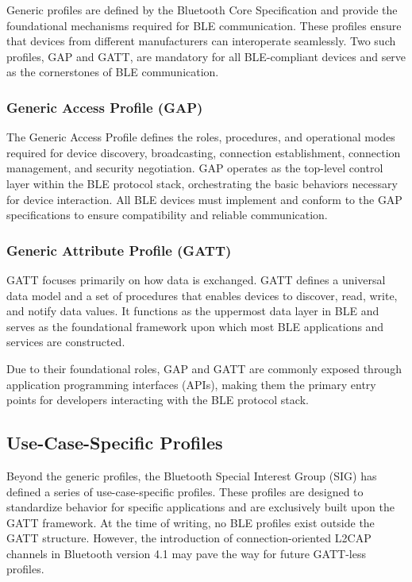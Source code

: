 Generic profiles are defined by the Bluetooth Core Specification and provide the foundational mechanisms required for BLE communication. These profiles ensure that devices from different manufacturers can interoperate seamlessly. Two such profiles, GAP and GATT, are mandatory for all BLE-compliant devices and serve as the cornerstones of BLE communication.

\subsubsection{Generic Access Profile (GAP)}

The Generic Access Profile defines the roles, procedures, and operational modes required for device discovery, broadcasting, connection establishment, connection management, and security negotiation. GAP operates as the top-level control layer within the BLE protocol stack, orchestrating the basic behaviors necessary for device interaction. All BLE devices must implement and conform to the GAP specifications to ensure compatibility and reliable communication.

\subsubsection{Generic Attribute Profile (GATT)}

GATT focuses primarily on how data is exchanged. GATT defines a universal data model and a set of procedures that enables devices to discover, read, write, and notify data values. It functions as the uppermost data layer in BLE and serves as the foundational framework upon which most BLE applications and services are constructed.

Due to their foundational roles, GAP and GATT are commonly exposed through application programming interfaces (APIs), making them the primary entry points for developers interacting with the BLE protocol stack.

\subsection{Use-Case-Specific Profiles}

Beyond the generic profiles, the Bluetooth Special Interest Group (SIG) has defined a series of use-case-specific profiles. These profiles are designed to standardize behavior for specific applications and are exclusively built upon the GATT framework. At the time of writing, no BLE profiles exist outside the GATT structure. However, the introduction of connection-oriented L2CAP channels in Bluetooth version 4.1 may pave the way for future GATT-less profiles.

